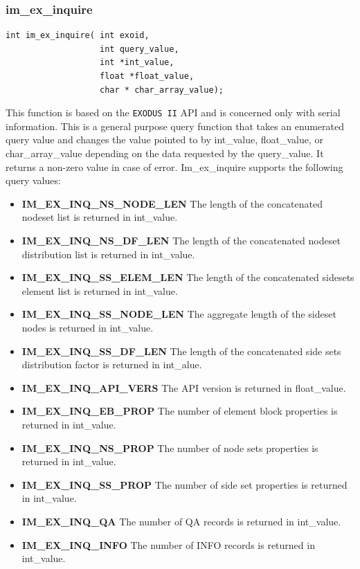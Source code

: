 \subsubsection{im\_ex\_inquire}
{\ttfamily  \begin{verbatim}
int im_ex_inquire( int exoid,
                   int query_value,
                   int *int_value,
                   float *float_value,
                   char * char_array_value);
\end{verbatim}}
This function is based on the \texttt{EXODUS II} API and is concerned only with serial information. This is a general purpose query function that takes an enumerated query value and changes the value pointed to by int\_value, float\_value, or char\_array\_value depending on the data requested by the query\_value. It returns a non-zero value in case of error. Im\_ex\_inquire supports the following query values:
\begin{itemize}\addtolength{\itemsep}{-0.5\baselineskip}\renewcommand{\labelitemi}{}
	\item \textbf{IM\_EX\_INQ\_NS\_NODE\_LEN} The length of the concatenated nodeset list is returned in int\_value.
  	\item \textbf{IM\_EX\_INQ\_NS\_DF\_LEN} The length of the concatenated nodeset distribution list is returned in int\_value.
  	\item \textbf{IM\_EX\_INQ\_SS\_ELEM\_LEN} The length of the concatenated sidesets element list is returned in int\_value.
  	\item \textbf{IM\_EX\_INQ\_SS\_NODE\_LEN} The aggregate length of the sideset nodes is returned in int\_value.
  	\item \textbf{IM\_EX\_INQ\_SS\_DF\_LEN } The length of the concatenated side sets distribution factor is returned in int\_alue.
  	\item \textbf{IM\_EX\_INQ\_API\_VERS} The API version is returned in float\_value.
	\item \textbf{IM\_EX\_INQ\_EB\_PROP} The number of element block properties is returned in int\_value.
	\item \textbf{IM\_EX\_INQ\_NS\_PROP} The number of node sets properties is returned in int\_value.
	\item \textbf{IM\_EX\_INQ\_SS\_PROP} The number of side set properties is returned in int\_value.
	\item \textbf{IM\_EX\_INQ\_QA} The number of QA records is returned in int\_value.
	\item \textbf{IM\_EX\_INQ\_INFO} The number of INFO records is returned in int\_value.

\end{itemize}

